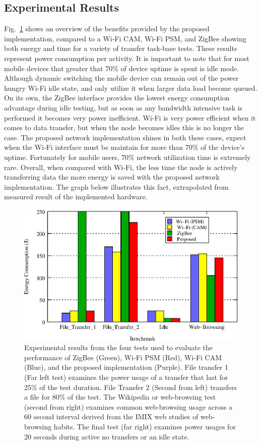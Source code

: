 \documentclass[conference]{IEEEtran}
\begin{document}
\subsection{Experimental Results}
Fig.~\ref{f:compare_results1} shows an overview of the benefits
provided by the proposed implementation, compared to a Wi-Fi CAM,
Wi-Fi PSM, and ZigBee showing both energy and time for a variety of
transfer task-base tests. These results represent power consumption
per activity.  It is important to note that for most mobile devices
that greater that 70\% of device uptime is spent is idle mode.
Although dynamic switching the mobile device can remain out of the
power hungry Wi-Fi idle state, and only utilize it when larger data
load become queued. On its own, the ZigBee interface provides the
lowest energy consumption advantage during idle testing, but as soon
as any bandwidth intensive task is performed it becomes very power
inefficient. Wi-Fi is very power efficient when it comes to data
transfer, but when the node becomes idles this is no longer the
case.  The proposed network implementation shines in both these
cases, expect when the Wi-Fi interface must be maintain for more
than 70\% of the device's uptime.  Fortunately for mobile users,
70\% network utilization time is extremely rare.  Overall, when
compared with Wi-Fi, the less time the node is actively transferring
data the more energy is saved with the proposed network
implementation.  The graph below illustrates this fact, extrapolated
from measured result of the implemented hardware.
\begin{figure}[t]
\begin{center}
\includegraphics[scale=0.65]{woot.eps}
\caption{Experimental results from the four tests used to evaluate
the performance of ZigBee (Green), Wi-Fi PSM (Red), Wi-Fi CAM
(Blue), and the proposed implementation (Purple).  File transfer 1
(Far left test) examines the power usage of a transfer that last for
25\% of the test duration.  File Transfer 2 (Second from left)
transfers a file for 80\% of the test. The Wikipedia or web-browsing
test (second from right) examines common web-browsing usage across a
60 second interval derived from the IMIX web studies of web-browsing
habits. \cite{twelve}  The final test (far right) examines power
usages for 20 seconds during active no transfers or an idle state.}
\end{center}\label{f:compare_results1}
\end{figure}
\end{document}
